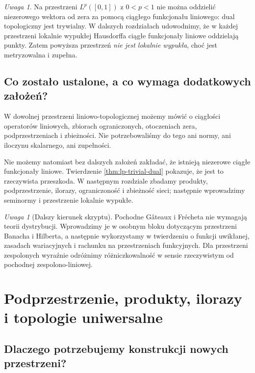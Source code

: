 \documentclass[11pt,a4paper]{article}
\numberwithin{equation}{section}
\theoremstyle{plain}
\theoremstyle{definition}
\theoremstyle{remark}
\newtheorem{uwaga}[twierdzenie]{Uwaga}
\begin{document}
\begin{uwaga}\label{rem:local-convexity-purpose}
Na przestrzeni $L^p([0,1])$ z $0<p<1$ nie można oddzielić
niezerowego wektora od zera za pomocą ciągłego funkcjonału
liniowego: dual topologiczny jest trywialny. W dalszych
rozdziałach udowodnimy, że w każdej przestrzeni lokalnie
wypukłej Hausdorffa ciągłe funkcjonały liniowe oddzielają
punkty. Zatem powyższa przestrzeń \emph{nie jest lokalnie wypukła},
choć jest metryzowalna i zupełna.
\end{uwaga}

\subsection{Co zostało ustalone, a co wymaga dodatkowych założeń?}

W dowolnej przestrzeni liniowo-topologicznej możemy mówić o
ciągłości operatorów liniowych, zbiorach ograniczonych, otoczeniach
zera, podprzestrzeniach i zbieżności. Nie potrzebowaliśmy do tego
ani normy, ani iloczynu skalarnego, ani zupełności.

Nie możemy natomiast bez dalszych założeń zakładać, że istnieją
niezerowe ciągłe funkcjonały liniowe. Twierdzenie
\ref{thm:lp-trivial-dual} pokazuje, że jest to rzeczywista
przeszkoda. W następnym rozdziale zbadamy produkty, podprzestrzenie,
ilorazy, ograniczoność i zbieżność sieci; następnie wprowadzimy
seminormy i przestrzenie lokalnie wypukłe.

\begin{uwaga}[Dalszy kierunek skryptu]
Pochodne Gâteaux i Frécheta nie wymagają teorii dystrybucji.
Wprowadzimy je w osobnym bloku dotyczącym przestrzeni Banacha
i Hilberta, a następnie wykorzystamy w twierdzeniu o funkcji
uwikłanej, zasadach wariacyjnych i rachunku na przestrzeniach
funkcyjnych. Dla przestrzeni zespolonych wyraźnie odróżnimy
różniczkowalność w sensie rzeczywistym od pochodnej
zespolono-liniowej.
\end{uwaga}


\bigskip
\setcounter{section}{1}
\section{Podprzestrzenie, produkty, ilorazy i topologie uniwersalne}\label{sec:konstrukcje}

\subsection{Dlaczego potrzebujemy konstrukcji nowych przestrzeni?}
\end{document}
